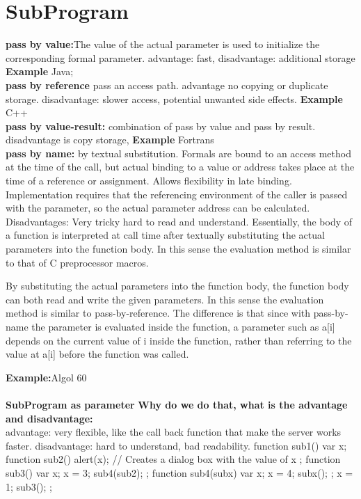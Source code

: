 \section{SubProgram}
\textbf{pass by value:}The value of the actual parameter is used to initialize the corresponding formal parameter. advantage: fast, disadvantage: additional storage
\textbf{Example} Java;\\
\textbf{pass by reference} pass an access path. advantage no copying or duplicate storage. disadvantage: slower access, potential unwanted side effects.
\textbf{Example} C++\\
\textbf{pass by value-result:} combination of pass by value and pass by result. disadvantage is copy storage, 
\textbf{Example} Fortrans\\
\textbf{pass by name:} by textual substitution. Formals are bound to an access method at the time of the call, but actual binding to a value or address takes place at the time of a reference or assignment. Allows flexibility in late binding. Implementation requires that the referencing environment of the caller is passed with the parameter, so the actual parameter address can be calculated. Disadvantages: Very tricky hard to read and understand. Essentially, the body of a function is interpreted at call time after textually substituting the actual parameters into the function body. In this sense the evaluation method is similar to that of C preprocessor macros.

By substituting the actual parameters into the function body, the function body can both read and write the given parameters. In this sense the evaluation method is similar to pass-by-reference. The difference is that since with pass-by-name the parameter is evaluated inside the function, a parameter such as a[i] depends on the current value of i inside the function, rather than referring to the value at a[i] before the function was called.


\textbf{Example:}Algol 60 \\

\\

\textbf{SubProgram as parameter}
\textbf{Why do we do that, what is the advantage and disadvantage:}\\
advantage: very flexible, like the call back function that make the server works faster.
disadvantage: hard to understand, bad readability. 
function sub1() {
var x;
function sub2() {
alert(x); // Creates a dialog box with the value of x
};
function sub3() {
var x;
x = 3;
sub4(sub2);
};
function sub4(subx) {
var x;
x = 4;
subx();
};
x = 1;
sub3();
};

